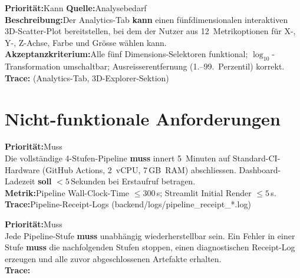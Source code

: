 \documentclass[11pt, a4paper, oneside, openany]{report}
\newcommand{\code}[1]{{\codefont\small\textcolor{DeepNavy}{#1}}}
\begin{document}
\vspace{6pt}

\begin{reqbox}
\textbf{Priorität:}\;Kann \quad \textbf{Quelle:}\;Analysebedarf \\[4pt]
\textbf{Beschreibung:}\;Der Analytics-Tab \textbf{kann} einen fünfdimensionalen interaktiven 3D-Scatter-Plot bereitstellen, bei dem der Nutzer aus 12~Metrikoptionen für X-, Y-, Z-Achse, Farbe und Grösse wählen kann. \\[4pt]
\textbf{Akzeptanzkriterium:}\;Alle fünf Dimensions-Selektoren funktional; $\log_{10}$-Transformation umschaltbar; Ausreisserentfernung (1.--99.~Perzentil) korrekt. \\[4pt]
\textbf{Trace:}\;\code{frontend/app.py} (Analytics-Tab, 3D-Explorer-Sektion)
\end{reqbox}

\section{Nicht-funktionale Anforderungen}
\label{sec:nfa}

\begin{reqbox}
\textbf{Priorität:}\;Muss \\[4pt]
Die vollständige 4-Stufen-Pipeline \textbf{muss} innert 5~Minuten auf Standard-CI-Hardware (GitHub Actions, 2~vCPU, 7\,GB~RAM) abschliessen. Dashboard-Ladezeit \textbf{soll} $< 5$\,Sekunden bei Erstaufruf betragen. \\[4pt]
\textbf{Metrik:}\;Pipeline Wall-Clock-Time $\leq 300$\,s; Streamlit Initial Render $\leq 5$\,s. \\[4pt]
\textbf{Trace:}\;Pipeline-Receipt-Logs (\code{backend/logs/pipeline\_receipt\_*.log})
\end{reqbox}

\vspace{6pt}

\begin{reqbox}
\textbf{Priorität:}\;Muss \\[4pt]
Jede Pipeline-Stufe \textbf{muss} unabhängig wiederherstellbar sein. Ein Fehler in einer Stufe \textbf{muss} die nachfolgenden Stufen stoppen, einen diagnostischen Receipt-Log erzeugen und alle zuvor abgeschlossenen Artefakte erhalten. \\[4pt]
\textbf{Trace:}\;\code{backend/pipeline.py :: \_run\_stage()}
\end{reqbox}
\end{document}
